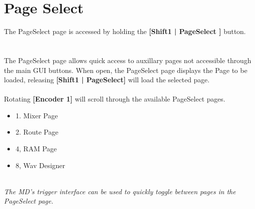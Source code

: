 \chapter{Page Select}
The PageSelect page is accessed by holding the \textbf{[Shift1 | PageSelect ]} button.
\\
\\
\\
The PageSelect page allows quick access to auxillary pages not accessible through the main GUI buttons.
When open, the PageSelect page displays the Page to be loaded, releasing \textbf{[Shift1 | PageSelect]} will load
the selected page.
\\
\\Rotating \textbf{[Encoder 1]} will scroll through the available PageSelect pages.
\begin{itemize}
	\item{1. Mixer Page}
	\item{2. Route Page}
	\item{4, RAM Page}
    \item{8, Wav Designer}
\end{itemize}
\\
\textit{The MD's trigger interface can be used to quickly toggle between pages in the PageSelect page. }






